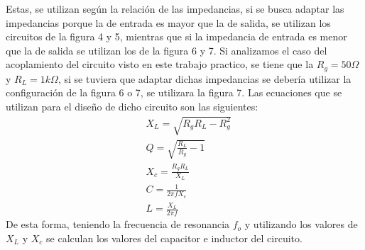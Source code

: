\bigskip

Estas, se utilizan según la relación de las impedancias, si se busca adaptar las impedancias porque la de entrada es mayor que la de salida, se utilizan los circuitos de la figura 4 y 5, mientras que si la impedancia de entrada es menor que la de salida se utilizan los de la figura 6 y 7. Si analizamos el caso del acoplamiento del circuito visto en este trabajo practico, se tiene que la $R_g=50\Omega$ y $R_L=1k\Omega$, si se tuviera que adaptar dichas impedancias se debería utilizar la configuración de la figura 6 o 7, se utilizara la figura 7.
Las ecuaciones que se utilizan para el diseño de dicho circuito son las siguientes:
\begin{equation}
\begin{aligned}
& X_L=\sqrt{R_g R_L-R_g^2} \\
& Q=\sqrt{\frac{R_L}{R_g}-1} \\
& X_c=\frac{R_g R_L}{X_L}   \\
& C = \frac{1}{2\pi f X_c} \\
& L = \frac{X_L}{2\pi f}
\end{aligned}
\end{equation}
De esta forma, teniendo la frecuencia de resonancia $f_o$ y utilizando los valores de $X_L$ y $X_c$ se calculan los valores del capacitor e inductor del circuito.